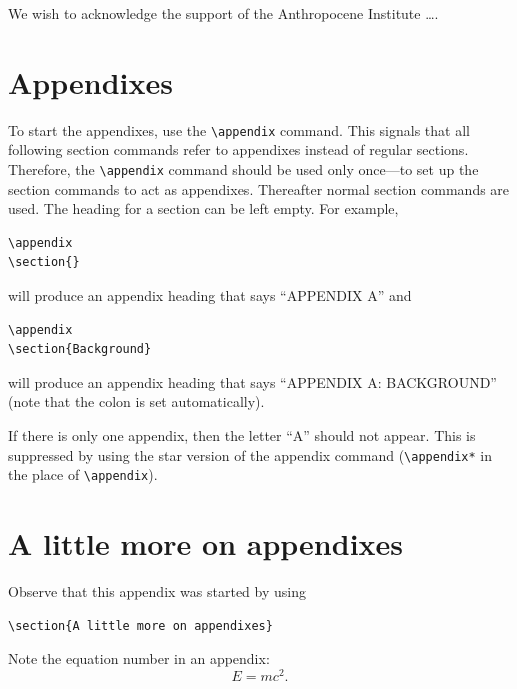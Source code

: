 \documentclass[%
 aip,
 jmp,%
 amsmath,amssymb,
 reprint,%
]{revtex4-1}
\begin{document}
\begin{acknowledgments}
We wish to acknowledge the support of the Anthropocene Institute
\dots.
\end{acknowledgments}

\appendix

\section{Appendixes}

To start the appendixes, use the \verb+\appendix+ command.
This signals that all following section commands refer to appendixes
instead of regular sections. Therefore, the \verb+\appendix+ command
should be used only once---to set up the section commands to act as
appendixes. Thereafter normal section commands are used. The heading
for a section can be left empty. For example,
\begin{verbatim}
\appendix
\section{}
\end{verbatim}
will produce an appendix heading that says ``APPENDIX A'' and
\begin{verbatim}
\appendix
\section{Background}
\end{verbatim}
will produce an appendix heading that says ``APPENDIX A: BACKGROUND''
(note that the colon is set automatically).

If there is only one appendix, then the letter ``A'' should not
appear. This is suppressed by using the star version of the appendix
command (\verb+\appendix*+ in the place of \verb+\appendix+).

\section{A little more on appendixes}

Observe that this appendix was started by using
\begin{verbatim}
\section{A little more on appendixes}
\end{verbatim}

Note the equation number in an appendix:
\begin{equation}
E=mc^2.
\end{equation}
\end{document}
